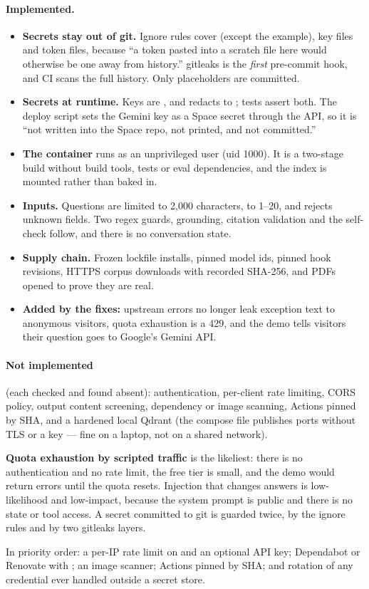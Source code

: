 \paragraph{Implemented.}
\begin{itemize}
  \item \textbf{Secrets stay out of git.} Ignore rules cover  (except the example), key files and token files, because ``a token pasted into a scratch file here would otherwise be one  away from history.'' gitleaks is the \emph{first} pre-commit hook, and CI scans the full history. Only placeholders are committed.
  \item \textbf{Secrets at runtime.} Keys are , and  redacts to \code{***}; tests assert both. The deploy script sets the Gemini key as a Space secret through the API, so it is ``not written into the Space repo, not printed, and not committed.''
  \item \textbf{The container} runs as an unprivileged user (uid 1000). It is a two-stage build without build tools, tests or eval dependencies, and the index is mounted rather than baked in.
  \item \textbf{Inputs.} Questions are limited to 2,000 characters,  to 1--20, and  rejects unknown fields. Two regex guards, grounding, citation validation and the self-check follow, and there is no conversation state.
  \item \textbf{Supply chain.} Frozen lockfile installs, pinned model ids, pinned hook revisions, HTTPS corpus downloads with recorded SHA-256, and PDFs opened to prove they are real.
  \item \textbf{Added by the fixes:} upstream errors no longer leak exception text to anonymous visitors, quota exhaustion is a 429, and the demo tells visitors their question goes to Google's Gemini API.
\end{itemize}

\paragraph{Not implemented} (each checked and found absent): authentication, per-client rate limiting, CORS policy, output content screening, dependency or image scanning, Actions pinned by SHA, and a hardened local Qdrant (the compose file publishes ports without TLS or a key --- fine on a laptop, not on a shared network).

\begin{inferred}
\textbf{Quota exhaustion by scripted traffic} is the likeliest: there is no authentication and no rate limit, the free tier is small, and the demo would return errors until the quota resets. Injection that changes answers is low-likelihood and low-impact, because the system prompt is public and there is no state or tool access. A secret committed to git is guarded twice, by the ignore rules and by two gitleaks layers.
\end{inferred}

\begin{recommended}
In priority order: a per-IP rate limit on  and an optional API key; Dependabot or Renovate with ; an image scanner; Actions pinned by SHA; and rotation of any credential ever handled outside a secret store.
\end{recommended}
